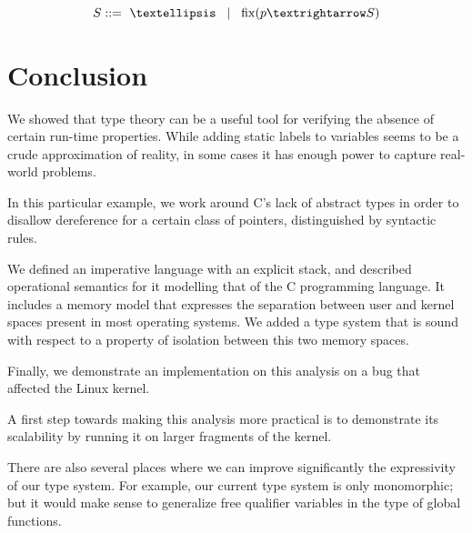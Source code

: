 {\small \[
    S \gramisa … \gramorx \mathrm{fix}(p → S)
\]}%

\section{Conclusion}
\label{sec:concl}

We showed that type theory can be a useful tool for verifying the absence of
certain run-time properties. While adding static labels to variables seems to be
a crude approximation of reality, in some cases it has enough power to capture
real-world problems.

In this particular example, we work around C's lack of abstract types in order
to disallow dereference for a certain class of pointers, distinguished by
syntactic rules.

We defined an imperative language with an explicit stack, and described
operational semantics for it modelling that of the C programming language. It
includes a memory model that expresses the separation between user and kernel
spaces present in most operating systems. We added a type system that is sound
with respect to a property of isolation between this two memory spaces.

Finally, we demonstrate an implementation on this analysis on a bug that
affected the Linux kernel.

A first step towards making this analysis more practical is to demonstrate its
scalability by running it on larger fragments of the kernel.

There are also several places where we can improve significantly the
expressivity of our type system. For example, our current type system is only
monomorphic; but it would make sense to generalize free qualifier variables in
the type of global functions.

